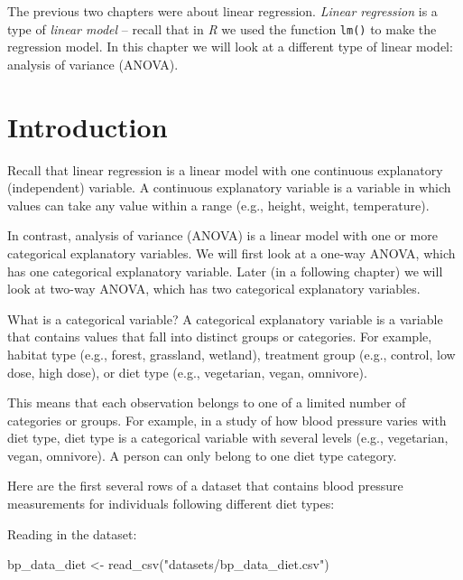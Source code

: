 \documentclass[
  letterpaper,
  8pt,
  a4paper]{book}
\newenvironment{Shaded}{\begin{snugshade}}{\end{snugshade}}
\newcommand{\FunctionTok}[1]{\textcolor[rgb]{0.28,0.35,0.67}{#1}}
\newcommand{\NormalTok}[1]{\textcolor[rgb]{0.00,0.23,0.31}{#1}}
\newcommand{\OtherTok}[1]{\textcolor[rgb]{0.00,0.23,0.31}{#1}}
\newcommand{\StringTok}[1]{\textcolor[rgb]{0.13,0.47,0.30}{#1}}
\begin{document}
The previous two chapters were about linear regression. \emph{Linear
regression} is a type of \emph{linear model} -- recall that in \emph{R}
we used the function \texttt{lm()} to make the regression model. In this
chapter we will look at a different type of linear model: analysis of
variance (ANOVA).

\section*{Introduction}\label{introduction-2}


Recall that linear regression is a linear model with one continuous
explanatory (independent) variable. A continuous explanatory variable is
a variable in which values can take any value within a range (e.g.,
height, weight, temperature).

In contrast, analysis of variance (ANOVA) is a linear model with one or
more categorical explanatory variables. We will first look at a one-way
ANOVA, which has one categorical explanatory variable. Later (in a
following chapter) we will look at two-way ANOVA, which has two
categorical explanatory variables.

What is a categorical variable? A categorical explanatory variable is a
variable that contains values that fall into distinct groups or
categories. For example, habitat type (e.g., forest, grassland,
wetland), treatment group (e.g., control, low dose, high dose), or diet
type (e.g., vegetarian, vegan, omnivore).

This means that each observation belongs to one of a limited number of
categories or groups. For example, in a study of how blood pressure
varies with diet type, diet type is a categorical variable with several
levels (e.g., vegetarian, vegan, omnivore). A person can only belong to
one diet type category.

Here are the first several rows of a dataset that contains blood
pressure measurements for individuals following different diet types:

Reading in the dataset:

\begin{Shaded}
\begin{Highlighting}[]
\NormalTok{bp\_data\_diet }\OtherTok{\textless{}{-}} \FunctionTok{read\_csv}\NormalTok{(}\StringTok{"datasets/bp\_data\_diet.csv"}\NormalTok{)}
\end{Highlighting}
\end{Shaded}
\end{document}

